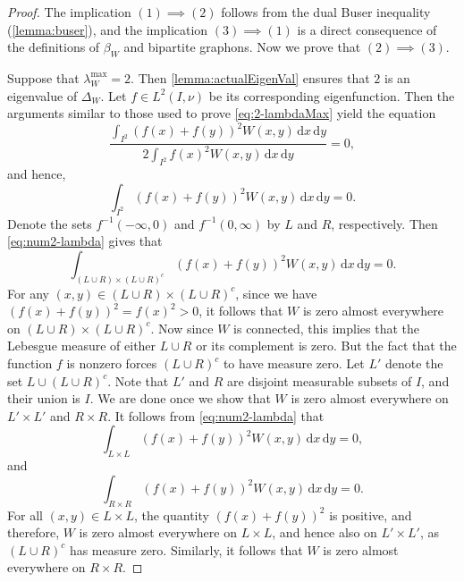 \documentclass[12pt,a4paper,bold]{thesis}
\theoremstyle{definition}
\begin{document}
\begin{proof}
    The implication $(1) \implies (2)$ follows from the dual Buser inequality 
    (\cref{lemma:buser}), and the implication $(3) \implies (1)$ is a direct
    consequence of the definitions of $\beta_W$ and bipartite graphons.
    Now we prove that $(2) \implies (3)$.

    Suppose that $\lambda_W^{\max} = 2$. Then \cref{lemma:actualEigenVal} ensures that 
    $2$ is an eigenvalue of $\Delta_W$. Let $f \in L^2(I,\nu)$ be 
    its corresponding eigenfunction. Then the arguments similar to those used
    to prove \cref{eq:2-lambdaMax} yield the equation
    \begin{equation*}
        \frac{\int_{I^2} (f(x) + f(y))^2 W(x,y)\, \mathrm{d}x\, \mathrm{d}y}
        {2 \int_{I^2} f(x)^2 W(x,y)\, \mathrm{d}x\, \mathrm{d}y} = 0,
    \end{equation*}
    and hence, 
    \begin{equation} \label{eq:num2-lambda}
        \int_{I^2} (f(x) + f(y))^2 W(x,y)\, \mathrm{d}x\, \mathrm{d}y = 0.
    \end{equation}
    Denote the sets $f^{-1}(-\infty,0)$ and $f^{-1}(0,\infty)$ by $L$ and $R$, respectively.
    Then \cref{eq:num2-lambda} gives that 
    \begin{equation*}
        \int_{(L \cup R) \times (L \cup R)^c} 
        (f(x) + f(y))^2 W(x,y)\, \mathrm{d}x\, \mathrm{d}y = 0.
    \end{equation*}
    For any $(x,y) \in (L \cup R) \times (L \cup R)^c$, since we have 
    $(f(x) + f(y))^2 = f(x)^2 > 0$, it follows that $W$ is zero almost everywhere
    on $(L \cup R) \times (L \cup R)^c$. Now since $W$ is connected, this implies that
    the Lebesgue measure of either $L \cup R$ or its complement is zero. But the fact 
    that the function $f$ is nonzero forces $(L \cup R)^c$ to have measure zero.
    Let $L'$ denote the set $L \cup (L \cup R)^c$. Note that $L'$ and $R$ are
    disjoint measurable subsets of $I$, and their union is $I$. We are done
    once we show that $W$ is zero almost everywhere on $L' \times L'$ and $R \times R$.
    It follows from \cref{eq:num2-lambda} that 
    \begin{equation*}
        \int_{L \times L} (f(x) + f(y))^2 W(x,y)\, \mathrm{d}x\, \mathrm{d}y = 0,
    \end{equation*}
    and
    \begin{equation*}    
        \int_{R \times R} (f(x) + f(y))^2 W(x,y)\, \mathrm{d}x\, \mathrm{d}y = 0.
    \end{equation*}
    For all $(x,y) \in L \times L$, the quantity $(f(x) + f(y))^2$ is positive, 
    and therefore, $W$ is zero almost everywhere on $L \times L$, and hence 
    also on $L' \times L'$, as $(L \cup R)^c$ has measure zero. 
    Similarly, it follows that $W$ is zero almost everywhere on $R \times R$.
\end{proof}
\end{document}
